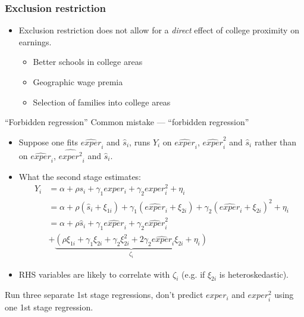 \documentclass[pdftex]{beamer}
\begin{document}
 
 
\begin{frame}
\frametitle{Exclusion restriction}
\begin{itemize}
\item Exclusion restriction does not allow for a \emph{direct} effect of college proximity on earnings.
\begin{itemize}
  \item Better schools in college areas
  \item Geographic wage premia
  \item Selection of families into college areas
\end{itemize}
\end{itemize}

\end{frame}

\begin{frame}{``Forbidden regression''}
Common mistake --- ``forbidden regression''
\begin{itemize}
	\item Suppose one fits $\widehat{exper}_i$ and $\widehat{s}_i$, runs $Y_i$ on $\widehat{exper}_i$, $\widehat{exper}_i^2$ and $\widehat{s}_i$ rather than on $\widehat{exper}_i$, $\widehat{exper^2}_i$ and $\widehat{s}_i$.
	\item What the second stage estimates:
	\begin{align*}
		Y_i &= \alpha + \rho s_i + \gamma_1 exper_i + \gamma_2 exper_i^2 + \eta_i\\
		&= \alpha + \rho (\widehat{s}_i + \xi_{1i}) + \gamma_1(\widehat{exper}_i + \xi_{2i}) + \gamma_2 (\widehat{exper}_i + \xi_{2i})^2 + \eta_i\\
		&= \alpha + \rho \widehat{s}_i + \gamma_1\widehat{exper}_i + \gamma_2 \widehat{exper}_i^2 \\
		& + \underbrace{(\rho\xi_{1i} + \gamma_1\xi_{2i} + \gamma_2\xi_{2i}^2 + 2\gamma_2\widehat{exper}_i\xi_{2i} + \eta_i)}_{\zeta_i}
	\end{align*}

	\item RHS variables are likely to correlate with $\zeta_i$ (e.g. if $\xi_{2i}$ is heteroskedastic).
\end{itemize}
Run three separate 1st stage regressions, don't predict $exper_i$ and $exper_i^2$ using one 1st stage regression. 
\end{frame}
\end{document}
